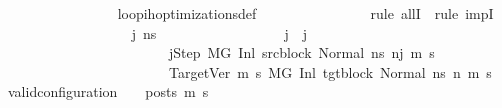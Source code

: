 \begin{isabellebody}
\ \ \ \ \ \ \ \ \ \ \ \ \ \ \isamarkupfalse%
\ loop{\isacharunderscore}{\kern0pt}ih{\isacharunderscore}{\kern0pt}optimizations{\isacharunderscore}{\kern0pt}def\isanewline
\ \ \ \ \ \ \ \ \ \ \ \ \ \ \isamarkupfalse%
\ {\isacharparenleft}{\kern0pt}rule\ allI\ {\isacharbar}{\kern0pt}\ rule\ impI{\isacharparenright}{\kern0pt}{\isacharplus}{\kern0pt}\isanewline
\ \ \ \ \ \ \ \ \ \ \ \ \ \ \ \ \isamarkupfalse%
\ j{\isacharprime}{\kern0pt}\ ns{}{\isacharprime}{\kern0pt}\isanewline
\ \ \ \ \ \ \ \ \ \ \ \ \ \ \ \ \isamarkupfalse%
\ {\isachardoublequoteopen}j{\isacharprime}{\kern0pt}\ {\isasymle}\ j{\isacharminus}{\kern0pt}{}{\isachardoublequoteclose}\ \isanewline
\ \ \ \ \ \ \ \ \ \ \ \ \ \ \ \ \ \ \ \ \ \ \ j{\isacharprime}{\kern0pt}Step{\isacharcolon}{\kern0pt}\ {\isachardoublequoteopen}M{\isacharcomma}{\kern0pt}{\isasymLambda}{\isacharcomma}{\kern0pt}{\isasymGamma}{\isacharcomma}{\kern0pt}{\isasymOmega}{\isacharcomma}{\kern0pt}G\ {\isasymturnstile}{\isacharparenleft}{\kern0pt}Inl\ src{\isacharunderscore}{\kern0pt}block{\isacharcomma}{\kern0pt}\ Normal\ ns{}{\isacharprime}{\kern0pt}{\isacharparenright}{\kern0pt}\ {\isacharminus}{\kern0pt}n{\isasymrightarrow}{\isacharcircum}{\kern0pt}j{\isacharprime}{\kern0pt}\ {\isacharparenleft}{\kern0pt}m{\isacharprime}{\kern0pt}{\isacharcomma}{\kern0pt}\ s{\isacharprime}{\kern0pt}{\isacharparenright}{\kern0pt}{\isachardoublequoteclose}\ \ \isanewline
\ \ \ \ \ \ \ \ \ \ \ \ \ \ \ \ \ \ \ \ \ \ \ TargetVer{\isacharcolon}{\kern0pt}\ {\isachardoublequoteopen}{\isasymforall}m{}{\isacharprime}{\kern0pt}\ s{}{\isacharprime}{\kern0pt}{\isachardot}{\kern0pt}\ {\isacharparenleft}{\kern0pt}M{\isacharcomma}{\kern0pt}{\isasymLambda}{\isacharcomma}{\kern0pt}{\isasymGamma}{\isacharcomma}{\kern0pt}{\isasymOmega}{\isacharcomma}{\kern0pt}G{\isacharprime}{\kern0pt}\ {\isasymturnstile}{\isacharparenleft}{\kern0pt}Inl\ tgt{\isacharunderscore}{\kern0pt}block{\isacharcomma}{\kern0pt}\ Normal\ ns{}{\isacharprime}{\kern0pt}{\isacharparenright}{\kern0pt}\ {\isacharminus}{\kern0pt}n{\isasymrightarrow}{\isacharasterisk}{\kern0pt}\ {\isacharparenleft}{\kern0pt}m{}{\isacharprime}{\kern0pt}{\isacharcomma}{\kern0pt}\ s{}{\isacharprime}{\kern0pt}{\isacharparenright}{\kern0pt}{\isacharparenright}{\kern0pt}\ {\isasymlongrightarrow}\ valid{\isacharunderscore}{\kern0pt}configuration\ {\isasymLambda}\ {\isasymGamma}\ {\isasymOmega}\ posts\ m{}{\isacharprime}{\kern0pt}\ s{}{\isacharprime}{\kern0pt}{\isachardoublequoteclose}\isanewline

\end{isabellebody}
